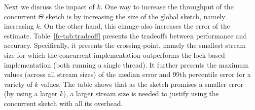 Next we discuss the impact of $k$.
One way to increase the throughput of the concurrent $\Theta$ sketch is by
increasing the size of the global sketch, namely increasing $k$. On the other hand,
this change also increases the error of the estimate.
Table~\ref{fc-tab:tradeoff} presents the tradeoffs between performance and accuracy.
Specifically, it presents the crossing-point, namely the smallest stream size for which the concurrent
implementation outperforms the lock-based implementation (both running a single thread). It further presents
the maximum values (across all stream sizes) of the median error and 99th percentile error for a variety of $k$ values.
The table shows that as the sketch promises a smaller error (by using a larger $k$), a larger stream size is needed to justify using
the concurrent sketch with all its overhead.

\begin{table}[htb]
\caption{{Performance vs accuracy as a function of $k$.}}
\label{fc-tab:tradeoff}
\end{table}  


